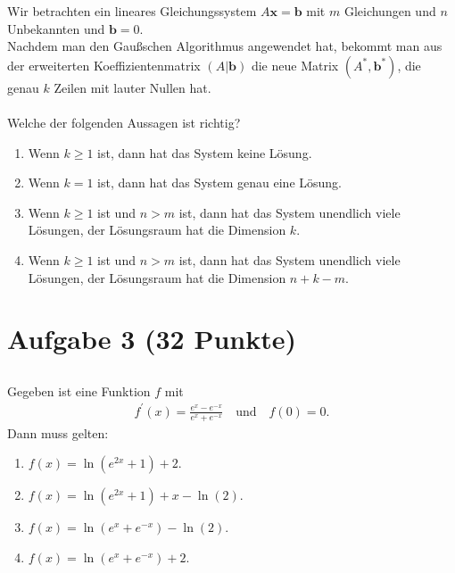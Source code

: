 \ \\
\subsection*{}
Wir betrachten ein lineares Gleichungssystem $ A \textbf{x} = \textbf{b} $ mit $ m $ Gleichungen und $ n $ Unbekannten und $ \textbf{b} = 0 $.\\
Nachdem man den Gaußschen Algorithmus angewendet hat, bekommt man aus der erweiterten Koeffizientenmatrix $ (A | \textbf{b}) $ die neue Matrix $ (A^\ast, \textbf{b}^\ast) $, die genau $ k $ Zeilen mit lauter Nullen hat.\\
\\
Welche der folgenden Aussagen ist richtig?
\renewcommand{\labelenumi}{(\alph{enumi})}
\begin{enumerate}
	\item 
	Wenn $ k \geq 1 $ ist, dann hat das System keine Lösung.
	\item
	Wenn $ k = 1 $ ist, dann hat das System genau eine Lösung.
	
	\item
	Wenn $ k \geq 1 $ ist und $ n > m  $ ist, dann hat das System unendlich viele Lösungen, der Lösungsraum hat die Dimension $ k $.
	\item
	Wenn $ k \geq 1 $ ist und $ n > m  $ ist, dann hat das System unendlich viele Lösungen, der Lösungsraum hat die Dimension $ n+k -m$.
	
\end{enumerate}
\newpage
\section*{Aufgabe 3 (32 Punkte)}
\vspace{0.4cm}

\subsection*{}
Gegeben ist eine Funktion $ f $ mit 
\begin{align*}
f^\prime(x) = \frac{e^x - e^{-x}}{e^x + e^{-x}} \quad \textrm{und} \quad f(0 )= 0.
\end{align*}
Dann muss gelten:
\renewcommand{\labelenumi}{(\alph{enumi})}
\begin{enumerate}
\item 
$ f(x) = \ln(e^{2x} + 1) + 2 $.
\item
$ f(x) = \ln(e^{2x} + 1) + x  - \ln(2)$.
\item
$ f(x) = \ln(e^{x} + e^{-x})  - \ln(2)$.
\item
$ f(x) = \ln(e^{x} + e^{-x})  +2$.
\end{enumerate}
\ \\
